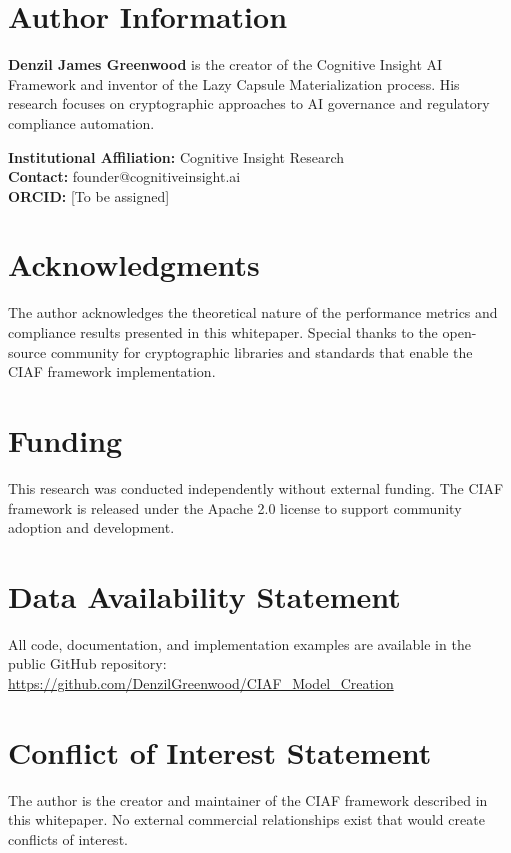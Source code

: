 \documentclass[12pt,a4paper]{article}
\begin{document}
\newpage

\section*{Author Information}

\textbf{Denzil James Greenwood} is the creator of the Cognitive Insight AI Framework and inventor of the Lazy Capsule Materialization process. His research focuses on cryptographic approaches to AI governance and regulatory compliance automation.

\textbf{Institutional Affiliation:} Cognitive Insight Research \\
\textbf{Contact:} founder@cognitiveinsight.ai \\
\textbf{ORCID:} [To be assigned]

\section*{Acknowledgments}

The author acknowledges the theoretical nature of the performance metrics and compliance results presented in this whitepaper. Special thanks to the open-source community for cryptographic libraries and standards that enable the CIAF framework implementation.

\section*{Funding}

This research was conducted independently without external funding. The CIAF framework is released under the Apache 2.0 license to support community adoption and development.

\section*{Data Availability Statement}

All code, documentation, and implementation examples are available in the public GitHub repository: \url{https://github.com/DenzilGreenwood/CIAF_Model_Creation}

\section*{Conflict of Interest Statement}

The author is the creator and maintainer of the CIAF framework described in this whitepaper. No external commercial relationships exist that would create conflicts of interest.
\end{document}
